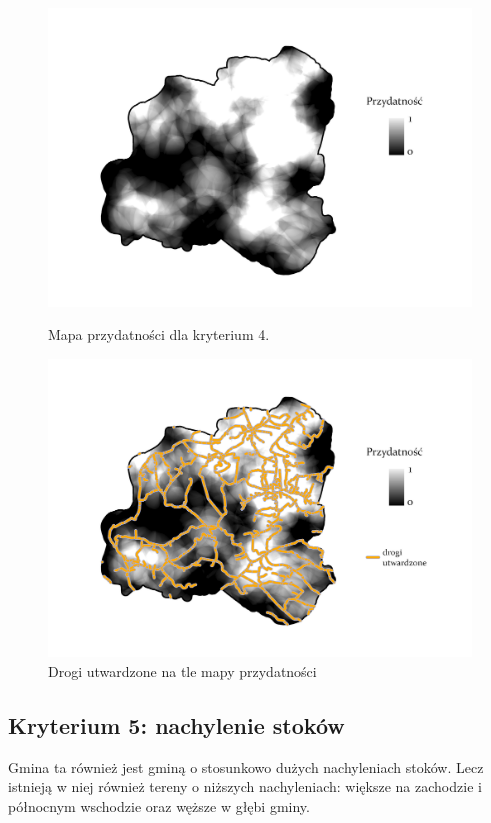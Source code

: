 \documentclass{article}
\begin{document}
\begin{figure}[H]
    \begin{minipage}[t]{0.48\textwidth}
        \centering
        \includegraphics[width=\linewidth]{img/plesna-kryterium4-layout.jpg}
        \caption{Mapa przydatności dla kryterium 4.}
        \label{fig:kryterium4-layout}
    \end{minipage}
    \hfill
    \begin{minipage}[t]{0.48\textwidth}
        \centering
        \includegraphics[width=\linewidth]{img/plesna-kryterium4-drogi.jpg}
        \caption{Drogi utwardzone na tle mapy przydatności}
        \label{fig:kryterium4-drogi}
    \end{minipage}
\end{figure}


\subsection{Kryterium 5: nachylenie stoków}
Gmina ta również jest gminą o stosunkowo dużych nachyleniach stoków. Lecz istnieją w niej również tereny o niższych nachyleniach: większe na zachodzie i północnym wschodzie oraz węższe w głębi gminy.
\end{document}
